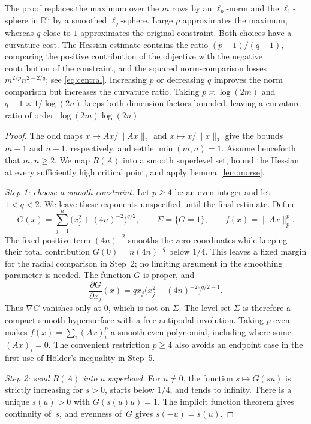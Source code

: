 \documentclass[11pt]{article}
\theoremstyle{remark}
\newcommand{\R}{\mathbb R}
\begin{document}
The proof replaces the maximum over the $m$ rows by an $\ell_p$-norm
and the $\ell_1$-sphere in $\R^n$ by a smoothed $\ell_q$-sphere.
Large $p$ approximates the
maximum, whereas $q$ close to $1$ approximates the original constraint.
Both choices have a curvature cost. The Hessian estimate contains the
ratio $(p-1)/(q-1)$, comparing the positive contribution of the objective
with the negative contribution of the constraint, and the squared
norm-comparison losses $m^{2/p}n^{2-2/q}$; see
\eqref{eq:central}. Increasing $p$ or decreasing $q$ improves the norm
comparison but increases the curvature ratio. Taking
$p\asymp\log(2m)$ and $q-1\asymp1/\log(2n)$ keeps both dimension
factors bounded, leaving a curvature ratio of order~$\log(2m)\log(2n)$.

\begin{proof}
The
odd maps $x\mapsto Ax/\|Ax\|_2$ and $x\mapsto x/\|x\|_2$ give
the bounds $m-1$ and $n-1$, respectively, and settle $\min(m,n)=1$.
Assume henceforth that $m,n\geq2$.
We map $R(A)$ into a smooth superlevel set, bound the Hessian
at every sufficiently high critical point, and apply
Lemma~\ref{lem:morse}.

\smallskip
\noindent\emph{Step 1: choose a smooth constraint.}
Let $p\geq4$ be an even integer and let $1<q<2$.
We leave these exponents unspecified until the final estimate.
Define
\[
 G(x)=\sum_{j=1}^n\bigl(x_j^2+(4n)^{-2}\bigr)^{q/2},\qquad
 \Sigma=\{G=1\},\qquad f(x)=\|Ax\|_p^p.
\]
The fixed positive term $(4n)^{-2}$ smooths the zero coordinates while
keeping their total contribution $G(0)=n(4n)^{-q}$ below $1/4$.
This leaves a fixed margin for the radial comparison in Step~2;
no limiting argument in the smoothing parameter is needed.
The function $G$ is proper, and
\[
 \frac{\partial G}{\partial x_j}(x)
 =qx_j\bigl(x_j^2+(4n)^{-2}\bigr)^{q/2-1}.
\]
Thus $\nabla G$ vanishes only at $0$, which is not on $\Sigma$.
The level set $\Sigma$ is therefore a compact smooth hypersurface
with a free antipodal involution. Taking $p$ even makes
$f(x)=\sum_i(Ax)_i^p$ a smooth even polynomial, including where
some $(Ax)_i=0$. The convenient restriction $p\geq4$ also avoids
an endpoint case in the first use of H\"older's inequality in Step~5.

\smallskip
\noindent\emph{Step 2: send $R(A)$ into a superlevel.}
For $u\ne0$, the function $s\mapsto G(su)$ is strictly increasing
for $s>0$, starts below $1/4$, and tends to infinity.
There is a unique $s(u)>0$ with $G(s(u)u)=1$.
The implicit function theorem gives continuity of~$s$, and evenness of~$G$
gives $s(-u)=s(u)$.


\end{proof}
\end{document}

